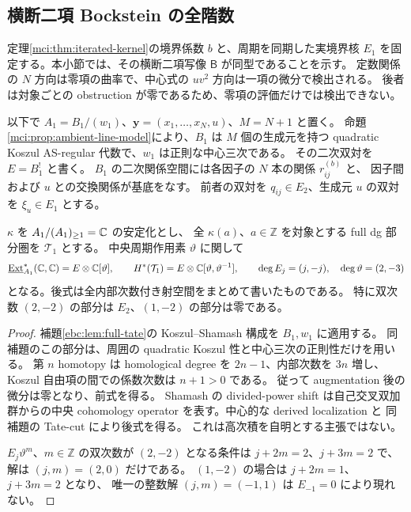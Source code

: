 \subsection{横断二項 Bockstein の全階数}
\label{mtb:subsec:transverse-bockstein}

定理\ref{mci:thm:iterated-kernel}の境界係数 $b$ と、周期を同期した実境界核
$E_1$ を固定する。本小節では、その横断二項写像 $\mathsf B$ が同型であることを示す。
定数関係の $N$ 方向は零項の曲率で、中心式の $uv^2$ 方向は一項の微分で検出される。
後者は対象ごとの obstruction が零であるため、零項の評価だけでは検出できない。

以下で $A_1=B_1/(w_1)$、$\mathbf y=(x_1,\ldots,x_N,u)$、$M=N+1$ と置く。
命題\ref{mci:prop:ambient-line-model}により、$B_1$ は $M$ 個の生成元を持つ
quadratic Koszul AS-regular 代数で、$w_1$ は正則な中心三次である。
その二次双対を $E=B_1^!$ と書く。
$B_1$ の二次関係空間には各因子の $N$ 本の関係 $r_{ij}^{(b)}$ と、
因子間および $u$ との交換関係が基底をなす。
前者の双対を $q_{ij}\in E_2$、生成元 $u$ の双対を $\xi_u\in E_1$ とする。

\begin{lemma}
\label{mtb:lem:tate-degrees}
$\kappa$ を $A_1/(A_1)_{\ge1}=\mathbb C$ の安定化とし、
全 $\kappa(a)$、$a\in\mathbb Z$ を対象とする full dg 部分圏を $\mathcal T_1$ とする。
中央周期作用素 $\vartheta$ に関して
\begin{equation}\label{mtb:eq:tate-module}
 \underline{\operatorname{Ext}}_{A_1}^*(\mathbb C,\mathbb C)
       =E\otimes\mathbb C[\vartheta],\qquad
 H^*(\mathcal T_1)=E\otimes\mathbb C[\vartheta,\vartheta^{-1}],
 \qquad \deg E_j=(j,-j),\quad\deg\vartheta=(2,-3)
\end{equation}
となる。後式は全内部次数付き射空間をまとめて書いたものである。
特に双次数 $(2,-2)$ の部分は $E_2$、$(1,-2)$ の部分は零である。
\end{lemma}

\begin{proof}
補題\ref{ebc:lem:full-tate}の Koszul--Shamash 構成を $B_1,w_1$ に適用する。
同補題のこの部分は、周囲の quadratic Koszul 性と中心三次の正則性だけを用いる。
第 $n$ homotopy は homological degree を $2n-1$、内部次数を $3n$ 増し、
Koszul 自由項の間での係数次数は $n+1>0$ である。
従って augmentation 後の微分は零となり、前式を得る。
Shamash の divided-power shift は自己交叉双加群からの中央 cohomology operator
を表す。中心的な derived localization
\cite[Theorem~5.3, Corollary~5.16]{NFMBCLLocalization}と
同補題の Tate-cut により後式を得る。
これは高次積を自明とする主張ではない。

$E_j\vartheta^m$、$m\in\mathbb Z$ の双次数が $(2,-2)$ となる条件は
$j+2m=2$、$j+3m=2$ で、解は $(j,m)=(2,0)$ だけである。
$(1,-2)$ の場合は $j+2m=1$、$j+3m=2$ となり、
唯一の整数解 $(j,m)=(-1,1)$ は $E_{-1}=0$ により現れない。
\end{proof}

